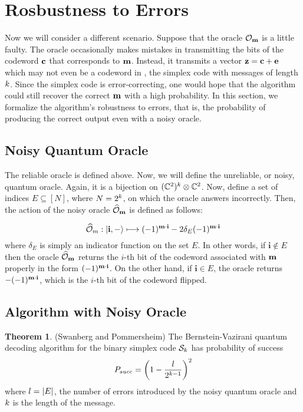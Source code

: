 \documentclass[12pt,twoside]{reedthesis}
\theoremstyle{definition}
\newtheorem{theorem}{Theorem}[chapter]
\newcommand{\C}{\mathbb{C}}
\newcommand{\ket}[1]{\ensuremath{\lvert #1\rangle}\xspace}
\begin{document}
\section{Rosbustness to Errors}
Now we will consider a different scenario. Suppose that the oracle $\mathcal{O}_\mathbf{m}$ is a little faulty. The oracle occasionally makes mistakes in transmitting the bits of the codeword $\mathbf{c}$ that corresponds to $\mathbf{m}$. Instead, it transmits a vector $\mathbf{z} = \mathbf{c}+\mathbf{e}$ which may not even be a codeword in \simpl{\mlen}, the simplex code with messages of length $k$. Since the simplex code is error-correcting, one would hope that the algorithm could still recover the correct $\mathbf{m}$ with a high probability. In this section, we formalize the algorithm's robustness to errors, that is, the probability of producing the correct output even with a noisy oracle. 

\subsection{Noisy Quantum Oracle}
The reliable oracle is defined above. Now, we will define the unreliable, or noisy, quantum oracle. Again, it is a bijection on $(\C^2)^\mlen \otimes \C^2$. Now, define a set of indices $E \subseteq [N]$, where $N = 2^k$, on which the oracle answers incorrectly. Then, the action of the noisy oracle $\widehat{\mathcal{O}}_\mathbf{m}$ is defined as follows:

\begin{equation*}
\widehat{\mathcal{O}}_m: \ket{\mathbf{i}, -} \longmapsto (-1)^{\mess \cdot \mathbf{i}} - 2\delta_E (-1)^{\mess \cdot \mathbf{i}}
\end{equation*}
where $\delta_E$ is simply an indicator function on the set $E$. In other words, if $\mathbf{i} \notin E$ then the oracle $\widehat{\mathcal{O}}_\mathbf{m}$ returns the $i$-th bit of the codeword associated with $\mathbf{m}$ properly in the form $(-1)^{\mathbf{m} \cdot \mathbf{i}}$. On the other hand, if $\mathbf{i} \in E$, the oracle returns $-(-1)^{\mathbf{m}\cdot \mathbf{i}}$, which is the $i$-th bit of the codeword flipped.
\subsection{Algorithm with Noisy Oracle}
\begin{theorem} \label{cool_thm}(Swanberg and Pommersheim) The Bernstein-Vazirani quantum decoding algorithm for the binary simplex code $\mathcal{S}_k$ has probability of success
\begin{equation*}
P_{succ} = \left(1 - \frac{l}{2^{k-1}}\right)^2
\end{equation*}
where $l= \lvert E \rvert$, the number of errors introduced by the noisy quantum oracle and $k$ is the length of the message.
\end{theorem}
\end{document}

